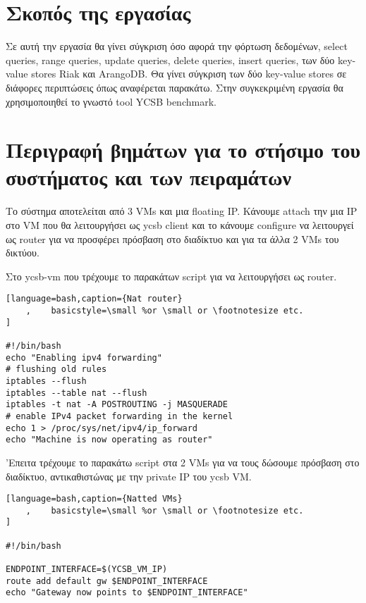\documentclass[conference]{IEEEtran}
\begin{document}
\section{Σκοπός της εργασίας}

Σε αυτή την εργασία θα γίνει σύγκριση όσο αφορά την φόρτωση δεδομένων, select queries, range queries,
update queries, delete queries, insert queries, των δύο key-value stores Riak και ArangoDB. Θα γίνει
σύγκριση των δύο key-value stores σε διάφορες περιπτώσεις όπως αναφέρεται παρακάτω. Στην συγκεκριμένη εργασία θα
χρησιμοποιηθεί το γνωστό tool YCSB benchmark.


\section{Περιγραφή βημάτων για το στήσιμο του συστήματος και των πειραμάτων}
Το σύστημα αποτελείται από 3 VMs και μια floating IP. Κάνουμε attach την μια IP 
στο VM που θα λειτουργήσει ως ycsb client και το κάνουμε configure να λειτουργεί
ως router για να προσφέρει πρόσβαση στο διαδίκτυο και για τα άλλα 2 VMs του δικτύου.

Στο ycsb-vm που τρέχουμε το παρακάτων script για να λειτουργήσει ως router.
\begin{lstlisting}[language=bash,caption={Nat router}
    ,    basicstyle=\small %or \small or \footnotesize etc.
]

#!/bin/bash
echo "Enabling ipv4 forwarding"
# flushing old rules
iptables --flush
iptables --table nat --flush
iptables -t nat -A POSTROUTING -j MASQUERADE
# enable IPv4 packet forwarding in the kernel
echo 1 > /proc/sys/net/ipv4/ip_forward
echo "Machine is now operating as router"
\end{lstlisting}

'Επειτα τρέχουμε το παρακάτω script στα 2 VMs για να τους δώσουμε πρόσβαση στο διαδίκτυο, αντικαθιστώνας με την private IP του ycsb VM.
\begin{lstlisting}[language=bash,caption={Natted VMs}
    ,    basicstyle=\small %or \small or \footnotesize etc.
]

#!/bin/bash

ENDPOINT_INTERFACE=$(YCSB_VM_IP)
route add default gw $ENDPOINT_INTERFACE
echo "Gateway now points to $ENDPOINT_INTERFACE"
\end{lstlisting}
\end{document}
